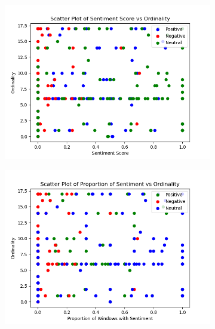 \documentclass[letterpaper,11pt]{article}
\begin{document}
    \begin{figure}[ht]
      \centering
      \begin{subfigure}{0.45\textwidth}
        \centering
        \includegraphics[width=\linewidth]{figs/foo2.png}
        \caption{}
        \label{fig:sub1}
      \end{subfigure}
      \hfill %
      \begin{subfigure}{0.45\textwidth}
        \centering
        \includegraphics[width=\linewidth]{figs/foo.png}
        \caption{}
        \label{fig:sub2}
      \end{subfigure}
      \caption{}
      \label{fig:main}
    \end{figure}
    
\end{document}

